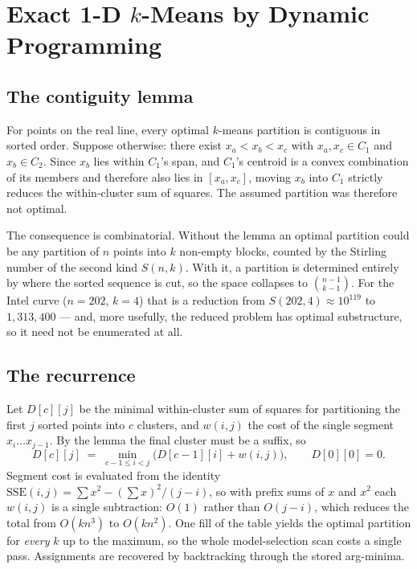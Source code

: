 \documentclass[conference]{IEEEtran}
\begin{document}
\section{Exact 1-D $k$-Means by Dynamic Programming}
\label{app:dp}

\subsection{The contiguity lemma}

For points on the real line, every optimal $k$-means partition is contiguous in
sorted order. Suppose otherwise: there exist $x_a < x_b < x_c$ with
$x_a, x_c \in C_1$ and $x_b \in C_2$. Since $x_b$ lies within $C_1$'s span, and
$C_1$'s centroid is a convex combination of its members and therefore also lies in
$[x_a, x_c]$, moving $x_b$ into $C_1$ strictly reduces the within-cluster sum of
squares. The assumed partition was therefore not optimal.

The consequence is combinatorial. Without the lemma an optimal partition could be
any partition of $n$ points into $k$ non-empty blocks, counted by the Stirling
number of the second kind $S(n,k)$. With it, a partition is determined entirely by
where the sorted sequence is cut, so the space collapses to $\binom{n-1}{k-1}$.
For the Intel curve ($n = 202$, $k = 4$) that is a reduction from $S(202,4)
\approx 10^{119}$ to $1{,}313{,}400$ --- and, more usefully, the reduced problem
has optimal substructure, so it need not be enumerated at all.

\subsection{The recurrence}

Let $D[c][j]$ be the minimal within-cluster sum of squares for partitioning the
first $j$ sorted points into $c$ clusters, and $w(i,j)$ the cost of the single
segment $x_i \ldots x_{j-1}$. By the lemma the final cluster must be a suffix, so
\[
D[c][j] \;=\; \min_{c-1 \le i < j}\bigl( D[c-1][i] + w(i,j) \bigr),
\qquad D[0][0] = 0 .
\]
Segment cost is evaluated from the identity
$\mathrm{SSE}(i,j) = \sum x^2 - (\sum x)^2/(j-i)$, so with prefix sums of $x$ and
$x^2$ each $w(i,j)$ is a single subtraction: $O(1)$ rather than $O(j-i)$, which
reduces the total from $O(kn^3)$ to $O(kn^2)$. One fill of the table yields the
optimal partition for \emph{every} $k$ up to the maximum, so the whole
model-selection scan costs a single pass. Assignments are recovered by
backtracking through the stored arg-minima.
\end{document}

